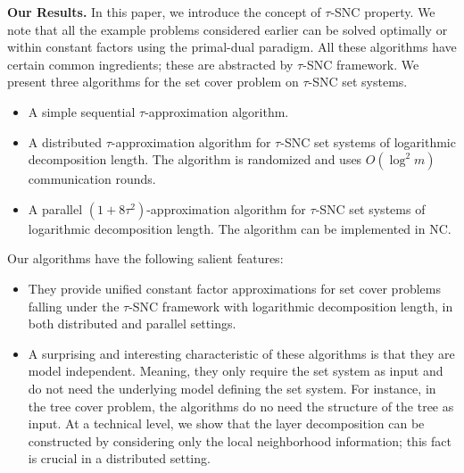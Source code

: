 \documentclass[11pt]{article}
\begin{document}
{\bf Our Results. }In this paper, we introduce the concept of $\tau$-SNC property.
We note that all the example problems considered earlier can be solved optimally or within constant factors
using the primal-dual paradigm. All these algorithms have certain common ingredients;
these are abstracted by $\tau$-SNC framework.
We present three algorithms for the set cover problem on $\tau$-SNC set systems.
\begin{itemize}
\item
A simple sequential $\tau$-approximation algorithm.
\item 
A distributed $\tau$-approximation algorithm for $\tau$-SNC set systems of logarithmic decomposition length.
The algorithm is randomized and uses $O(\log^2 m)$ communication rounds.
\item
A parallel $(1+8\tau^2)$-approximation algorithm for $\tau$-SNC set systems of logarithmic decomposition length.
The algorithm can be implemented in NC.
\end{itemize}

Our algorithms have the following salient features:
\begin{itemize}
\item
They provide unified constant factor approximations for set cover problems falling under the $\tau$-SNC 
framework with logarithmic decomposition length, in both distributed and parallel settings.
\item
A surprising and interesting characteristic of these algorithms is that they are model independent. 
Meaning, they only require the set system as input and do not need the underlying model defining the set system.
For instance, in the tree cover problem, the algorithms do no need the structure of the tree as input.
At a technical level, we show that the layer decomposition can be constructed by considering only the local 
neighborhood information; this fact is crucial in a distributed setting.
\end{itemize}
\end{document}
